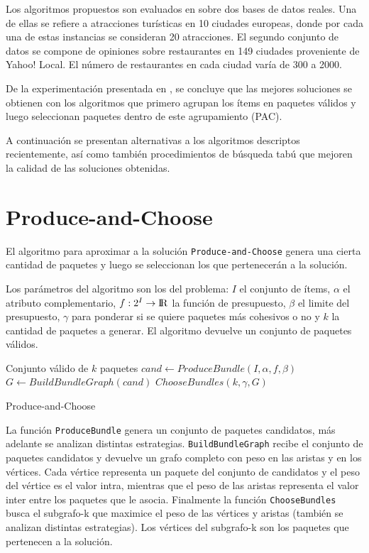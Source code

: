 Los algoritmos propuestos son evaluados en \cite{compositeRetrival} sobre dos bases de datos reales. Una de ellas se refiere a atracciones turísticas en 10 ciudades europeas, donde por cada una de estas instancias se consideran 20 atracciones. El segundo conjunto de datos se compone de opiniones sobre restaurantes en 149 ciudades proveniente de Yahoo! Local. El número de restaurantes en cada ciudad varía de 300 a 2000.

De la experimentación presentada en \cite{compositeRetrival}, se concluye que las mejores soluciones se obtienen con los algoritmos que primero agrupan los ítems en paquetes válidos y luego seleccionan paquetes dentro de este agrupamiento (PAC). 

A continuación se presentan alternativas a los algoritmos descriptos recientemente, así como también procedimientos de búsqueda tabú que mejoren la calidad de las soluciones obtenidas.

\section{Produce-and-Choose}
El algoritmo para aproximar a la solución \texttt{Produce-and-Choose} genera una cierta cantidad de paquetes y luego se seleccionan los que pertenecerán a la solución.

Los parámetros del algoritmo son los del problema: $I$ el conjunto de ítems, $\alpha$ el atributo complementario, $f: 2^{I} \rightarrow \rm I \!R$ la función de presupuesto, $\beta$ el limite del presupuesto, $\gamma$ para ponderar si se quiere paquetes más cohesivos o no y $k$ la cantidad de paquetes a generar. El algoritmo devuelve un conjunto de paquetes válidos.

\begin{algorithm}[H]
\begin{algorithmic}[1]
\ENSURE Conjunto válido de $k$ paquetes
\STATE $cand \leftarrow ProduceBundle(I,\alpha,f,\beta)$
\STATE $G \leftarrow BuildBundleGraph(cand)$
\RETURN $ChooseBundles(k,\gamma,G)$
\end{algorithmic}
\caption{Produce-and-Choose}\label{alg:PAC}
\end{algorithm}

La función \texttt{ProduceBundle} genera un conjunto de paquetes candidatos, más adelante se analizan distintas estrategias. \texttt{BuildBundleGraph} recibe el conjunto de paquetes candidatos y devuelve un grafo completo con peso en las aristas y en los vértices. Cada vértice representa un paquete del conjunto de candidatos y el peso del vértice es el valor intra, mientras que el peso de las aristas representa el valor inter entre los paquetes que le asocia. Finalmente la función \texttt{ChooseBundles} busca el subgrafo-k que maximice el peso de las vértices y aristas (también se analizan distintas estrategias). Los vértices del subgrafo-k son los paquetes que pertenecen a la solución.\\

